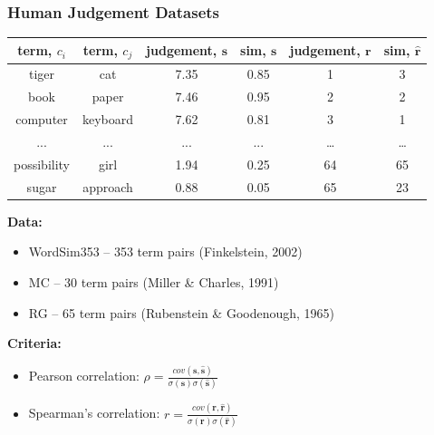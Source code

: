 \documentclass{beamer}
\begin{document}
\begin{frame}
\frametitle{Human Judgement Datasets}

\begin{table}[h]\footnotesize
\begin{tabular}{ |c|c|c|c|c|c| }
\hline
  term, $c_i$ & term, $c_j$ & judgement, $\mathbf{s}$  & sim, $\mathbf{s}$  & judgement, $\mathbf{r}$ & sim, $\hat{\mathbf{r}}$  \\ \hline \hline
tiger & cat & 7.35 & 0.85 & 1 & 3 \\
book & paper & 7.46 &  0.95 & 2 & 2 \\
computer & keyboard & 7.62 &  0.81 & 3 & 1 \\
... & ... & ... & ...   & \ldots & \ldots \\
possibility & girl & 1.94 & 0.25 & 64 & 65 \\
sugar & approach & 0.88 & 0.05 & 65 & 23 \\ \hline
\end{tabular}
\end{table}


\textbf{Data:}

\begin{itemize}
	\item WordSim353 -- 353 term pairs (Finkelstein, 2002)  
	\item MC -- 30 term pairs  (Miller & Charles, 1991)
	\item RG -- 65 term pairs (Rubenstein & Goodenough, 1965)  
\end{itemize}

\textbf{Criteria:}
\begin{itemize}
\item Pearson correlation:  $\rho = \frac{cov(\mathbf{s},\hat{\mathbf{s}})}{\sigma(\mathbf{s}) \sigma(\hat{\mathbf{s}})}$

 \item Spearman's correlation: $r = \frac{cov(\mathbf{r},\hat{\mathbf{r}})}{\sigma(\mathbf{r}) \sigma(\hat{\mathbf{r}})}$
 
 \end{itemize}
 
\end{frame}
\end{document}
